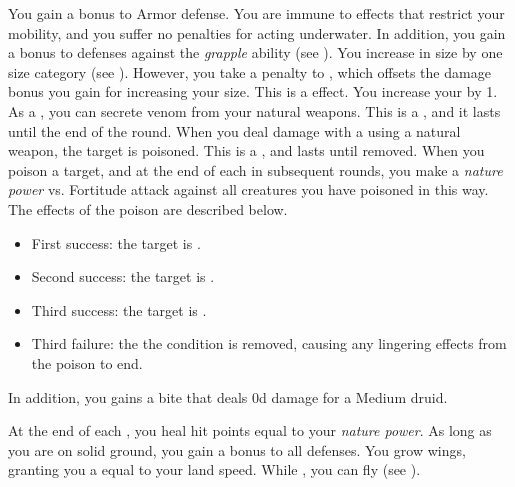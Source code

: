          You gain a  bonus to Armor defense.
         You are immune to effects that restrict your mobility, and you suffer no penalties for acting underwater.
        In addition, you gain a  bonus to defenses against the \textit{grapple} ability (see ).
        You increase in size by one size category (see ).
        However, you take a  penalty to , which offsets the damage bonus you gain for increasing your size.
        This is a  effect.
        You increase your  by 1.
        As a , you can secrete venom from your natural weapons.
        This is a , and it lasts until the end of the round.
        When you deal damage with a  using a natural weapon, the target is poisoned.
        This is a , and lasts until removed.
        When you poison a target, and at the end of each  in subsequent rounds, you make a \textit{nature power} vs. Fortitude attack against all creatures you have poisoned in this way.
        The effects of the poison are described below.
        \begin{itemize}
            \item First success: the target is \sickened.
            \item Second success: the target is \nauseated.
            \item Third success: the target is \paralyzed.
            \item Third failure: the the condition is removed, causing any lingering effects from the poison to end.
        \end{itemize}
        \par In addition, you gains a bite  that deals \plus0d damage for a Medium druid.

        At the end of each , you heal hit points equal to your \textit{nature power}.
         As long as you are on solid ground, you gain a  bonus to all defenses.
        You grow wings, granting you a  equal to your land speed.
        While , you can fly (see ).

